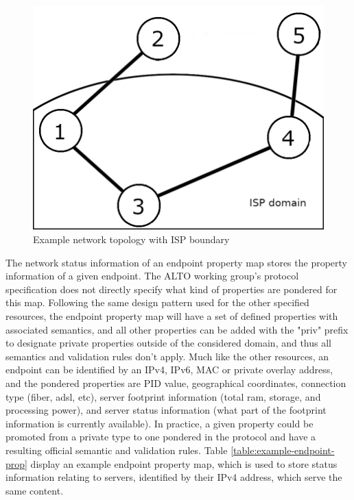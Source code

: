 \begin{figure}[!h]
        \centering
        \includegraphics[scale=1.00]{img/topology-boundary.png}
        \caption{Example network topology with ISP boundary}
        \label{fig:example-topology-boundary}
\end{figure}

    The network status information of an endpoint property map stores the property information of a given endpoint.
    The ALTO working group's protocol specification \cite{alto-protocol} does not directly specify what kind of properties are pondered for this map.
    Following the same design pattern used for the other specified resources, the endpoint property map will have a set of defined properties with associated semantics, and all other properties can be added with the "priv" prefix to designate private properties outside of the considered domain, and thus all semantics and validation rules don't apply.
    Much like the other resources, an endpoint can be identified by an IPv4, IPv6, MAC or private overlay address, and the pondered properties are PID value, geographical coordinates, connection type (fiber, adsl, etc), server footprint information (total ram, storage, and processing power), and server status information (what part of the footprint information is currently available).
    In practice, a given property could be promoted from a private type to one pondered in the protocol and have a resulting official semantic and validation rules.
    Table \ref{table:example-endpoint-prop} display an example endpoint property map, which is used to store status information relating to servers, identified by their IPv4 address, which serve the same content.

